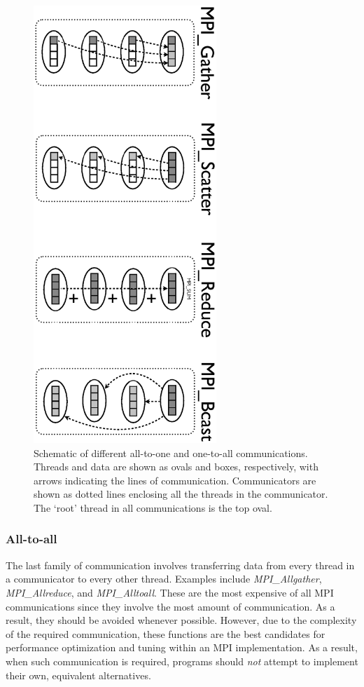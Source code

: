 \begin{figure}
   \includegraphics[height=6.5in, angle=90, trim=7.5cm 0cm 0cm 0cm, clip=true]
         {AllToPoint.ps}
   \caption[Schematic of different all-to-one and one-to-all communications.
            Threads and data are shown as ovals and boxes, respectively]
           {Schematic of different all-to-one and one-to-all communications.
            Threads and data are shown as ovals and boxes, respectively, with
            arrows indicating the lines of communication. Communicators are
            shown as dotted lines enclosing all the threads in the communicator.
            The `root' thread in all communications is the top oval.}
   \label{figC:AllToPoint}
\end{figure}

\subsubsection{All-to-all}

The last family of communication involves transferring data from every thread in
a communicator to every other thread. Examples include \emph{MPI\_Allgather},
\emph{MPI\_Allreduce}, and \emph{MPI\_Alltoall}. These are the most expensive of
all MPI communications since they involve the most amount of communication. As a
result, they should be avoided whenever possible. However, due to the complexity
of the required communication, these functions are the best candidates for
performance optimization and tuning within an MPI implementation. As a result,
when such communication is required, programs should \emph{not} attempt to
implement their own, equivalent alternatives.

